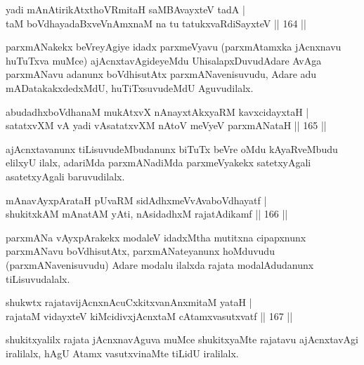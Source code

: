 
\begin{shl}
yadi mAnAtirikAtxthoVR\s mitaH saMBAvayxteV tadA | \\
taM boVdhayadaBxveVnAmxnaM na tu tatukxvaRdiSayxteV \hfill||  164 ||  
\end{shl}

\begin{artha}
parxmANakekx beVreyAgiye idadx parxmeVyavu (parxmAtamxka jAcnxnavu huTuTxva muMce) ajAcnxtavAgideyeMdu UhisalapxDuvudAdare AvAga parxmANavu adanunx boVdhisutAtx parxmANavenisuvudu, Adare adu mADatakakxdedxMdU, huTiTxsuvudeMdU Aguvudilalx.
\end{artha}

\begin{shl}
abudadhxboVdhanaM mukAtxvX nAnayxtAkxyaRM kavxcidayxtaH | \\
satatxvXM vA yadi vA\s satatxvXM nAtoV meVyeV parxmANataH \hfill||  165 ||  
\end{shl}

\begin{artha}
ajAcnxtavanunx tiLisuvudeMbudanunx biTuTx beVre oMdu kAyaRveMbudu elilxyU ilalx, adariMda parxmANadiMda parxmeVyakekx satetxyAgali asatetxyAgali baruvudilalx.
\end{artha}

\begin{shl}
mAnavAyxpArataH pUvaRM sidAdhxmeVvAvaboVdhayatf |  \\
shukitxkAM mAnatAM yAti, nAsidadhxM rajatAdikamf \hfill||  166 ||  
\end{shl}

\begin{artha}
parxmANa vAyxpArakekx modaleV idadxMtha mutitxna cipapxnunx parxmANavu boVdhisutAtx, parxmANateyanunx hoMduvudu (parxmANavenisuvudu) Adare modalu ilalxda rajata modalAdudanunx tiLisuvudalalx.
\end{artha}


\begin{shl}
shukwtx rajatavijAcnxnAcuCxkitxvanAnxmitaM yataH | \\
rajataM vidayxteV kiMcidivxjAcnxtaM cA\s \s tamxvasutxvatf \hfill||  167 ||  
\end{shl}

\begin{artha}
shukitxyalilx rajata jAcnxnavAguva muMce shukitxyaMte rajatavu ajAcnxtavAgi iralilalx, hAgU Atamx vasutxvinaMte tiLidU iralilalx.
\end{artha}

